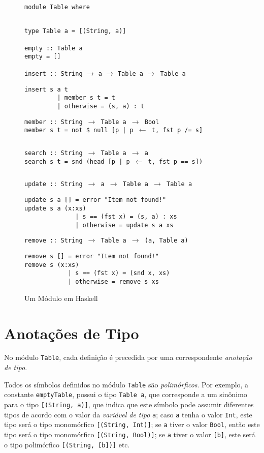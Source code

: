 \begin{figure}
   \begin{verbatim}module Table where\end{verbatim}
   \begin{verbatim}

type Table a = [(String, a)]

empty :: Table a
empty = []
   \end{verbatim}
   \texttt{insert :: String} $\rightarrow$ \texttt{a} $\rightarrow$ \texttt{Table a} $\rightarrow$\texttt{ Table a}   
   \begin{verbatim}
insert s a t 
         | member s t = t
         | otherwise = (s, a) : t
   \end{verbatim}
   \texttt{member :: String $\rightarrow$ Table a $\rightarrow$ Bool}\\
   \texttt{member s t = not \$ null [p | p $\leftarrow$ t, fst p /= s]}
   \begin{verbatim}\end{verbatim}
   \texttt{search :: String $\rightarrow$ Table a $\rightarrow$ a}\\
   \texttt{search s t = snd (head [p | p $\leftarrow$ t, fst p == s])}
   \begin{verbatim}\end{verbatim}
   \texttt{update :: String $\rightarrow$ a $\rightarrow$ Table a $\rightarrow$ Table a}
   \begin{verbatim} 
update s a [] = error "Item not found!"
update s a (x:xs)  
              | s == (fst x) = (s, a) : xs
              | otherwise = update s a xs
   \end{verbatim}
   \texttt{remove :: String $\rightarrow$ Table a $\rightarrow$ (a, Table a)}
   \begin{verbatim}
remove s [] = error "Item not found!"
remove s (x:xs)
            | s == (fst x) = (snd x, xs)
            | otherwise = remove s xs   
   \end{verbatim}
   \caption{Um M\'odulo em Haskell}
   \label{fig2}
\end{figure}

\section{Anota\c{c}\~oes de Tipo}

No m\'odulo \texttt{Table}, cada defini\c{c}\~ao \'e precedida por uma cor\-res\-pon\-den\-te 
\emph{anota\c{c}\~ao de tipo}. 

Todos os s\'imbolos definidos no m\'odulo
\texttt{Table} s\~ao \emph{polim\'orficos}. Por exemplo, a constante
\texttt{emptyTable}, possui o tipo \texttt{Table a}, que corresponde a um
sin\^onimo para o tipo \texttt{[(String, a)]}, que indica que este s\'imbolo
pode assumir diferentes tipos de acordo com o valor da \emph{vari\'avel de tipo}
\texttt{a}; caso \texttt{a} tenha o valor \texttt{Int}, este tipo ser\'a o tipo monom\'orfico \texttt{[(String, Int)]}; 
se \texttt{a} tiver o valor \texttt{Bool}, ent\~ao este tipo ser\'a o tipo monom\'orfico 
\texttt{[(String, Bool)]}; se \texttt{a} tiver o valor \texttt{[b]}, este ser\'a o tipo polim\'orfico 
\texttt{[(String, [b])]} etc.


